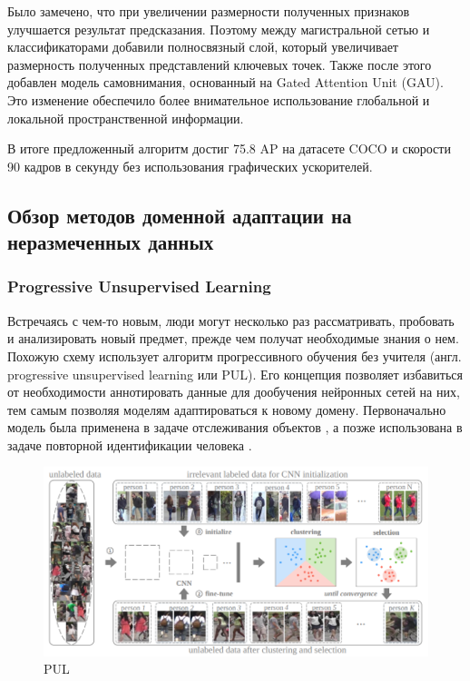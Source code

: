 Было замечено, что при увеличении размерности полученных признаков улучшается результат предсказания. Поэтому между магистральной сетью и классификаторами добавили полносвязный слой, который увеличивает размерность полученных представлений ключевых точек. Также после этого добавлен модель самовнимания, основанный на Gated Attention Unit (GAU). Это изменение обеспечило более внимательное использование глобальной и локальной пространственной информации.


В итоге предложенный алгоритм достиг 75.8 AP на датасете COCO и скорости 90 кадров в секунду без использования графических ускорителей.


\subsection{Обзор методов доменной адаптации на неразмеченных данных}
\label{sec:Chapter4_DA}


\subsubsection*{Progressive Unsupervised Learning}

Встречаясь с чем-то новым, люди могут несколько раз рассматривать, пробовать и анализировать новый предмет, прежде чем получат необходимые знания о нем. Похожую схему использует алгоритм прогрессивного обучения без учителя (англ. progressive unsupervised learning или PUL). Его концепция позволяет избавиться от необходимости аннотировать данные для дообучения нейронных сетей на них, тем самым позволяя моделям адаптироваться к новому домену. Первоначально модель была применена в задаче отслеживания объектов \cite{pul}, а позже использована в задаче повторной идентификации человека \cite{pul_person}.

\begin{figure}[h]
	\centering
	\includegraphics[width=.8\textwidth]{./images/review/pul}
	\caption{PUL \cite{pul_person}}
	\label{fig:pul}
\end{figure}

